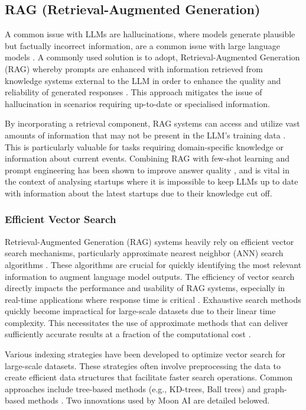 \documentclass[a4paper, oneside]{discothesis}
\begin{document}
\subsection{RAG (Retrieval-Augmented Generation)}
A common issue with LLMs are hallucinations, where models generate plausible but factually incorrect information, are a common issue with large language models \cite{maynez2020faithfulness}. A commonly used solution is to adopt, Retrieval-Augmented Generation (RAG) whereby prompts are enhanced with information retrieved from knowledge systems external to the LLM in order to enhance the quality and reliability of generated responses \cite{lewis2020retrieval}. This approach mitigates the issue of hallucination in scenarios requiring up-to-date or specialised information.

By incorporating a retrieval component, RAG systems can access and utilize vast amounts of information that may not be present in the LLM's training data \cite{lewis2020retrieval}. This is particularly valuable for tasks requiring domain-specific knowledge or information about current events.
Combining RAG with few-shot learning and prompt engineering has been shown to improve answer quality \cite{liu2021pre}, and is vital in the context of analysing startups where it is impossible to keep LLMs up to date with information about the latest startups due to their knowledge cut off.


\subsubsection{Efficient Vector Search}
Retrieval-Augmented Generation (RAG) systems heavily rely on efficient vector search mechanisms, particularly approximate nearest neighbor (ANN) search algorithms \cite{johnson2019billion}. These algorithms are crucial for quickly identifying the most relevant information to augment language model outputs. The efficiency of vector search directly impacts the performance and usability of RAG systems, especially in real-time applications where response time is critical \cite{lewis2020retrieval}. Exhaustive search methods quickly become impractical for large-scale datasets due to their linear time complexity. This necessitates the use of approximate methods that can deliver sufficiently accurate results at a fraction of the computational cost \cite{andoni2018approximate}.

Various indexing strategies have been developed to optimize vector search for large-scale datasets. These strategies often involve preprocessing the data to create efficient data structures that facilitate faster search operations. Common approaches include tree-based methods (e.g., KD-trees, Ball trees) and graph-based methods \cite{malkov2018efficient}. Two innovations used by Moon AI are detailed belowed.
\end{document}
